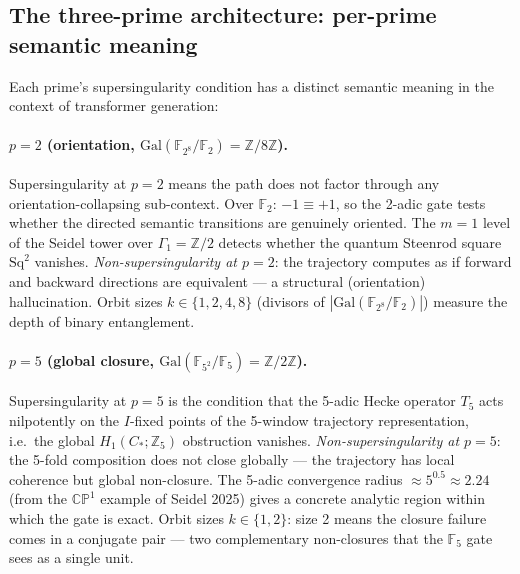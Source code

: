 \documentclass[11pt,a4paper]{article}
\begin{document}
\subsection{The three-prime architecture: per-prime semantic meaning}
\label{sec:three-prime-meaning}

Each prime's supersingularity condition has a distinct semantic meaning
in the context of transformer generation:

\paragraph{$p = 2$ (orientation, $\mathrm{Gal}(\mathbb{F}_{2^8}/\mathbb{F}_2) = \mathbb{Z}/8\mathbb{Z}$).}
Supersingularity at $p=2$ means the path does not factor through any
orientation-collapsing sub-context.
Over $\mathbb{F}_2$: $-1 \equiv +1$, so the 2-adic gate tests whether
the directed semantic transitions are genuinely oriented.
The $m=1$ level of the Seidel tower over $\Gamma_1 = \mathbb{Z}/2$
detects whether the quantum Steenrod square $\mathrm{Sq}^2$ vanishes.
\emph{Non-supersingularity at $p=2$}: the trajectory computes
as if forward and backward directions are equivalent ---
a structural (orientation) hallucination.
Orbit sizes $k \in \{1,2,4,8\}$ (divisors of $|\mathrm{Gal}(\mathbb{F}_{2^8}/\mathbb{F}_2)|$)
measure the depth of binary entanglement.

\paragraph{$p = 5$ (global closure, $\mathrm{Gal}(\mathbb{F}_{5^2}/\mathbb{F}_5) = \mathbb{Z}/2\mathbb{Z}$).}
Supersingularity at $p=5$ is the condition that the 5-adic Hecke
operator $T_5$ acts nilpotently on the $I$-fixed points of the
5-window trajectory representation, i.e.\ the global
$H_1(C_*;\mathbb{Z}_5)$ obstruction vanishes.
\emph{Non-supersingularity at $p=5$}: the 5-fold composition does
not close globally --- the trajectory has local coherence but
global non-closure.
The 5-adic convergence radius $\approx 5^{0.5} \approx 2.24$
(from the $\mathbb{CP}^1$ example of Seidel 2025) gives a concrete
analytic region within which the gate is exact.
Orbit sizes $k \in \{1,2\}$: size 2 means the closure failure
comes in a conjugate pair --- two complementary non-closures
that the $\mathbb{F}_5$ gate sees as a single unit.
\end{document}
